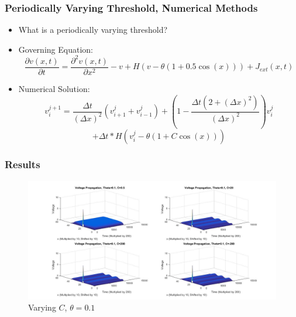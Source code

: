 \documentclass{beamer}
\begin{document}
\begin{frame}
\frametitle{Periodically Varying Threshold, Numerical Methods}
\begin{itemize}
	\item{What is a periodically varying threshold?}
	\item{Governing Equation:}
\[\frac{\partial{v(x,t)}}{\partial{t}}=\frac{\partial^2{v(x,t)}}{\partial{x}^2}-v+H(v-\theta(1+0.5\cos(x)))+J_{ext}(x,t)\]
	\item{Numerical Solution:}
\[v^{j+1}_i=\frac{\Delta{t}}{(\Delta{x})^2}(v^{j}_{i+1}+v^{j}_{i-1})+(1-\frac{\Delta{t}(2+(\Delta{x})^2)}{(\Delta{x})^2})v^{j}_{i}\]
\[+\Delta{t}*H(v^j_i-\theta(1+C\cos(x)))\]
\end{itemize}
\end{frame}


\begin{frame}
\frametitle{Results}
\begin{figure}[H]
  \includegraphics[width=\linewidth]{plotsomething.jpg}
  \caption{Varying $C$, $\theta=0.1$}
  \label{fig:sketch10}
\end{figure}
\end{frame}
\end{document}
